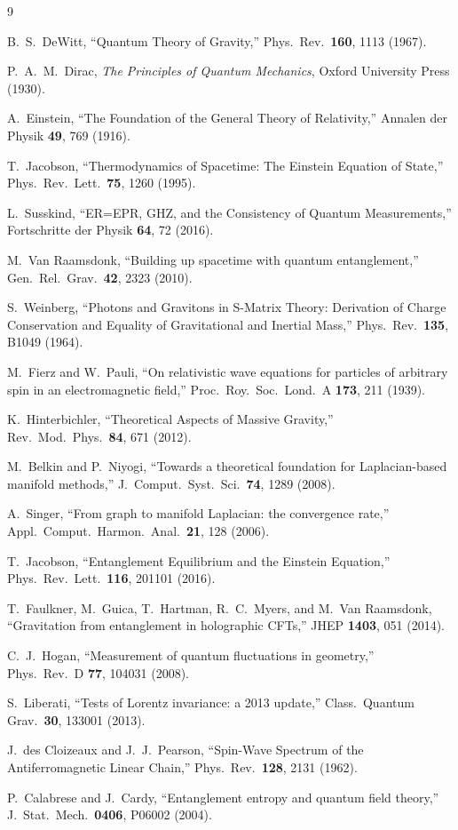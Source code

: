 \documentclass[11pt]{article}
\begin{document}
\begin{thebibliography}{9}

B.~S.~DeWitt, ``Quantum Theory of Gravity,'' Phys.\ Rev.\ \textbf{160}, 1113 (1967).

P.~A.~M.~Dirac, \emph{The Principles of Quantum Mechanics}, Oxford University Press (1930).

A.~Einstein, ``The Foundation of the General Theory of Relativity,'' Annalen der Physik \textbf{49}, 769 (1916).

T.~Jacobson, ``Thermodynamics of Spacetime: The Einstein Equation of State,'' Phys.\ Rev.\ Lett.\ \textbf{75}, 1260 (1995).

L.~Susskind, ``ER=EPR, GHZ, and the Consistency of Quantum Measurements,'' Fortschritte der Physik \textbf{64}, 72 (2016).

M.~Van Raamsdonk, ``Building up spacetime with quantum entanglement,'' Gen.\ Rel.\ Grav.\ \textbf{42}, 2323 (2010).

S.~Weinberg, ``Photons and Gravitons in S-Matrix Theory: Derivation of Charge Conservation and Equality of Gravitational and Inertial Mass,'' Phys.\ Rev.\ \textbf{135}, B1049 (1964).

M.~Fierz and W.~Pauli, ``On relativistic wave equations for particles of arbitrary spin in an electromagnetic field,'' Proc.\ Roy.\ Soc.\ Lond.\ A \textbf{173}, 211 (1939).

K.~Hinterbichler, ``Theoretical Aspects of Massive Gravity,'' Rev.\ Mod.\ Phys.\ \textbf{84}, 671 (2012).

M.~Belkin and P.~Niyogi, ``Towards a theoretical foundation for Laplacian-based manifold methods,'' J.\ Comput.\ Syst.\ Sci.\ \textbf{74}, 1289 (2008).

A.~Singer, ``From graph to manifold Laplacian: the convergence rate,'' Appl.\ Comput.\ Harmon.\ Anal.\ \textbf{21}, 128 (2006).

T.~Jacobson, ``Entanglement Equilibrium and the Einstein Equation,'' Phys.\ Rev.\ Lett.\ \textbf{116}, 201101 (2016).

T.~Faulkner, M.~Guica, T.~Hartman, R.~C.~Myers, and M.~Van Raamsdonk, ``Gravitation from entanglement in holographic CFTs,'' JHEP \textbf{1403}, 051 (2014).

C.~J.~Hogan, ``Measurement of quantum fluctuations in geometry,'' Phys.\ Rev.\ D \textbf{77}, 104031 (2008).

S.~Liberati, ``Tests of Lorentz invariance: a 2013 update,'' Class.\ Quantum Grav.\ \textbf{30}, 133001 (2013).

J.~des Cloizeaux and J.~J.~Pearson, ``Spin-Wave Spectrum of the Antiferromagnetic Linear Chain,'' Phys.\ Rev.\ \textbf{128}, 2131 (1962).

P.~Calabrese and J.~Cardy, ``Entanglement entropy and quantum field theory,'' J.\ Stat.\ Mech.\ \textbf{0406}, P06002 (2004).

\end{thebibliography}
\end{document}
